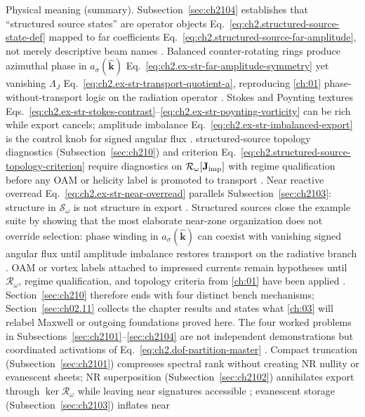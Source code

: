 Physical meaning (summary). Subsection~\ref{sec:ch2104} establishes that ``structured source states'' are operator objects
Eq.~\eqref{eq:ch2.structured-source-state-def} mapped to far coefficients
Eq.~\eqref{eq:ch2.structured-source-far-amplitude}, not merely descriptive beam names
\cite{stratton1941}. Balanced counter-rotating rings produce azimuthal
phase in \(a_\sigma(\widehat{\mathbf{k}})\) Eq.~\eqref{eq:ch2.ex-str-far-amplitude-symmetry} yet
vanishing \(\Lambda_J\) Eq.~\eqref{eq:ch2.ex-str-transport-quotient-a}, reproducing
\ref{ch:01} phase-without-transport logic on the radiation operator
\cite{stratton1941}. Stokes and Poynting textures
Eqs.~\eqref{eq:ch2.ex-str-stokes-contrast}--\eqref{eq:ch2.ex-str-poynting-vorticity} can be
rich while export cancels; amplitude imbalance Eq.~\eqref{eq:ch2.ex-str-imbalanced-export} is the
control knob for signed angular flux \cite{stratton1941}. structured-source topology diagnostics (Subsection~\ref{sec:ch210}) and criterion
Eq.~\eqref{eq:ch2.structured-source-topology-criterion} require diagnostics on
\(\mathcal{R}_\omega[\mathbf{J}_{\mathrm{imp}}]\) with regime qualification before any OAM or helicity label is
promoted to transport \cite{harrington2001}. Near reactive overread
Eq.~\eqref{eq:ch2.ex-str-near-overread} parallels Subsection~\ref{sec:ch2103}: structure in
\(\mathcal{S}_\omega\) is not structure in export \cite{stratton1941}.
Structured sources close the example suite by showing that the most elaborate near-zone organization does not override selection: phase winding in $a_\sigma(\widehat{\mathbf{k}})$ can coexist with vanishing signed angular flux until amplitude imbalance restores transport on the radiative branch \cite{belinfante1940}. OAM or vortex labels attached to impressed currents remain hypotheses until $\mathcal{R}_\omega$, regime qualification, and topology criteria from \ref{ch:01} have been applied \cite{harrington2001}. Section~\ref{sec:ch210} therefore ends with four distinct bench mechanisms; Section~\ref{sec:ch02.11} collects the chapter results and states what \ref{ch:03} will relabel Maxwell or outgoing foundations proved here.
The four worked problems in Subsections~\ref{sec:ch2101}--\ref{sec:ch2104} are not independent
demonstrations but coordinated activations of Eq.~\eqref{eq:ch2.dof-partition-master}
\cite{stratton1941}. Compact truncation
(Subsection~\ref{sec:ch2101}) compresses spectral rank without creating NR nullity or evanescent
sheets; NR superposition (Subsection~\ref{sec:ch2102}) annihilates export through
\(\ker\mathcal{R}_\omega\) while leaving near signatures accessible
\cite{bleszynski1996}; evanescent storage (Subsection~\ref{sec:ch2103}) inflates near

